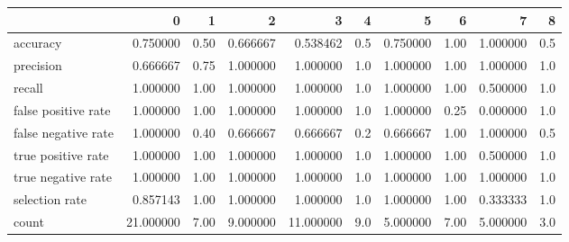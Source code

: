 \begin{tabular}{lrrrrrrrrr}
\toprule
{} &          0 &     1 &         2 &          3 &    4 &         5 &     6 &         7 &    8 \\
\midrule
accuracy            &   0.750000 &  0.50 &  0.666667 &   0.538462 &  0.5 &  0.750000 &  1.00 &  1.000000 &  0.5 \\
precision           &   0.666667 &  0.75 &  1.000000 &   1.000000 &  1.0 &  1.000000 &  1.00 &  1.000000 &  1.0 \\
recall              &   1.000000 &  1.00 &  1.000000 &   1.000000 &  1.0 &  1.000000 &  1.00 &  0.500000 &  1.0 \\
false positive rate &   1.000000 &  1.00 &  1.000000 &   1.000000 &  1.0 &  1.000000 &  0.25 &  0.000000 &  1.0 \\
false negative rate &   1.000000 &  0.40 &  0.666667 &   0.666667 &  0.2 &  0.666667 &  1.00 &  1.000000 &  0.5 \\
true positive rate  &   1.000000 &  1.00 &  1.000000 &   1.000000 &  1.0 &  1.000000 &  1.00 &  0.500000 &  1.0 \\
true negative rate  &   1.000000 &  1.00 &  1.000000 &   1.000000 &  1.0 &  1.000000 &  1.00 &  1.000000 &  1.0 \\
selection rate      &   0.857143 &  1.00 &  1.000000 &   1.000000 &  1.0 &  1.000000 &  1.00 &  0.333333 &  1.0 \\
count               &  21.000000 &  7.00 &  9.000000 &  11.000000 &  9.0 &  5.000000 &  7.00 &  5.000000 &  3.0 \\
\bottomrule
\end{tabular}
